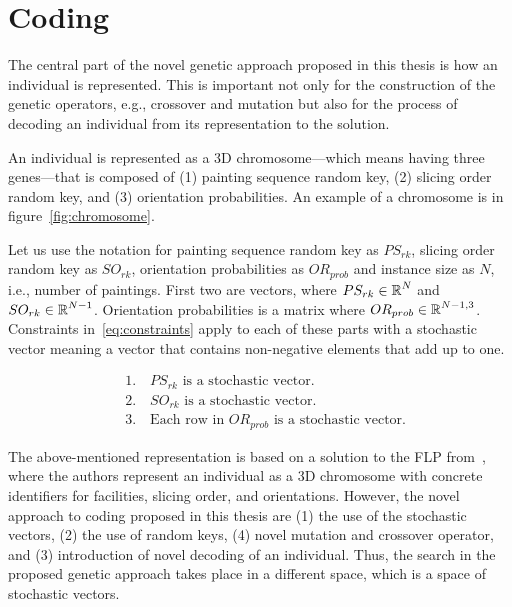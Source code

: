 \section{Coding}\label{sec:coding}

The central part of the novel genetic approach proposed in this thesis is how an individual is represented.
This is important not only for the construction of the genetic operators, e.g., crossover and mutation
but also for the process of decoding an individual from its representation to the solution.

An individual is represented as a 3D chromosome—which means having three genes—that is composed of
(1) painting sequence random key, (2) slicing order random key, and (3) orientation probabilities.
An example of a chromosome is in figure~\ref{fig:chromosome}.

Let us use the notation for painting sequence random key as $PS_{rk}$,
slicing order random key as $SO_{rk}$,
orientation probabilities as $OR_{prob}$ and instance size as $N$, i.e., number of paintings.
First two are vectors, where $PS_{rk} \in \operatorname*{\mathbb{R}}^N$ and $SO_{rk} \in \operatorname*{\mathbb{R}}^{N-1}$.
Orientation probabilities is a matrix where $OR_{prob} \in \operatorname*{\mathbb{R}}^{N-1, 3}$.
Constraints in~\ref{eq:constraints} apply to each of these parts with
a stochastic vector meaning a vector that contains non-negative elements that add up to one.

\begin{equation}
    \begin{aligned}
        & 1. \quad PS_{rk} \text{ is a stochastic vector.} \\
        & 2. \quad SO_{rk} \text{ is a stochastic vector.} \\
        & 3. \quad \text{Each row in } OR_{prob} \text{ is a stochastic vector.}
    \end{aligned}\label{eq:constraints}
\end{equation}


The above-mentioned representation is based on a solution to the FLP
from~\cite{friedrichIntegratedSlicingTree2018, riponAdaptiveVariableNeighborhood2013},
where the authors represent an individual as a 3D chromosome with concrete identifiers for facilities, slicing order, and orientations.
However, the novel approach to coding proposed in this thesis are (1) the use of the stochastic vectors, (2) the use of random keys, (4) novel mutation and crossover operator, and
(3) introduction of novel decoding of an individual.
Thus, the search in the proposed genetic approach takes place in a different space, which is a space of stochastic vectors.

